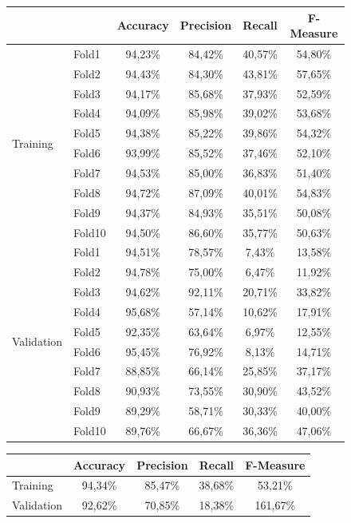 \begin{figure}[H]
	\centering
	\begin{tabular}{llcccc}
		\toprule
		&& \textbf{Accuracy} & \textbf{Precision} & \textbf{Recall} & 
		\textbf{F-Measure}  \\
		\midrule
		\multirow{10}{*}{Training} & Fold1 & 94,23\% & 84,42\% & 40,57\% & 
		54,80\% \\
		& Fold2 & 94,43\%  & 84,30\% & 43,81\% & 57,65\% \\
		& Fold3 & 94,17\%  & 85,68\% & 37,93\% & 52,59\% \\
		& Fold4 & 94,09\%  & 85,98\% & 39,02\% & 53,68\% \\
		& Fold5 & 94,38\%  & 85,22\% & 39,86\% & 54,32\% \\
		& Fold6 & 93,99\%  & 85,52\% & 37,46\% & 52,10\% \\
		& Fold7 & 94,53\%  & 85,00\% & 36,83\% & 51,40\% \\
		& Fold8 & 94,72\%  & 87,09\% & 40,01\% & 54,83\% \\
		& Fold9 & 94,37\%  & 84,93\% & 35,51\% & 50,08\% \\
		& Fold10 & 94,50\% & 86,60\% & 35,77\% & 50,63\%  \\
		\midrule
		\multirow{10}{*}{Validation} & Fold1 & 94,51\% & 78,57\% & 7,43\% & 
		13,58\% \\
		& Fold2 & 94,78\% & 75,00\% & 6,47\% & 11,92\% \\
		& Fold3 & 94,62\% & 92,11\% & 20,71\% & 33,82\% \\
		& Fold4 & 95,68\% & 57,14\% & 10,62\% & 17,91\% \\
		& Fold5 & 92,35\% & 63,64\% & 6,97\% & 12,55\% \\
		& Fold6 & 95,45\% & 76,92\% & 8,13\% & 14,71\% \\
		& Fold7 & 88,85\% & 66,14\% & 25,85\% & 37,17\% \\
		& Fold8 & 90,93\% & 73,55\% & 30,90\% & 43,52\% \\
		& Fold9 & 89,29\% & 58,71\% & 30,33\% & 40,00\% \\
		& Fold10 & 89,76\% & 66,67\% & 36,36\% & 47,06\% \\
		\bottomrule 
	\end{tabular}
	\label{tab:rf_cv_fold_performance}
\end{figure}

\begin{figure}[H]
	\centering
	\begin{tabular}{lcccc}
		\toprule
		& \textbf{Accuracy} & \textbf{Precision} & \textbf{Recall} & 
		\textbf{F-Measure}  \\
		\midrule
		Training	&  94,34\% & 85,47\% & 38,68\%	& 53,21\%  	\\ 
		Validation	&  92,62\% & 70,85\% & 18,38\%	& 161,67\%	\\ 
		\bottomrule
	\end{tabular}
	\label{tab:rf_cv_performance}
\end{figure}


